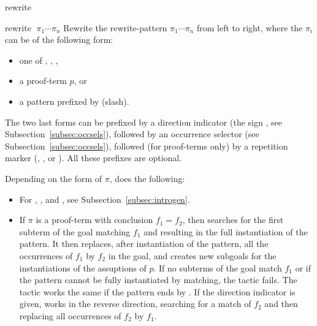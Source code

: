 \begin{tactic}{rewrite}
  \begin{tsyntax}{rewrite $\;\pi_1 \cdots \pi_n$}
  Rewrite the rewrite-pattern $\pi_1 \cdots \pi_n$ from left to right,
  where the $\pi_i$ can be of the following form:
  \begin{itemize}
  \item one of \ec{//}, \ec{/=}, \ec{//=},
  \item a proof-term $p$, or
  \item a pattern prefixed by \ec{/} (slash).
  \end{itemize}
  The two last forms can be prefixed by a direction indicator (the
  sign \ec{-}, see Subsection~\ref{subsec:occsels}), followed by an
  occurrence selector (see Subsection~\ref{subsec:occsels}), followed
  (for proof-terms only) by a repetition marker (\ec{!}, ,
   or ). All these prefixes are optional.

  \smallskip
  Depending on the form of $\pi$,  does the following:
    \begin{itemize}
    \item For \ec{//}, \ec{/=}, and \ec{//=}, see
      Subsection~\ref{subsec:introgen}.

    \item If $\pi$ is a proof-term with conclusion $f_1=f_2$, then
       searches for the first subterm of the goal matching
      $f_1$ and resulting in the full instantiation of the pattern.
      It then replaces, after instantiation of the pattern, all the
      occurrences of $f_1$ by $f_2$ in the goal, and creates
      new subgoals for the instantiations of the assuptions of $p$.
      If no subterms of the goal match $f_1$ or if the pattern
      cannot be fully instantiated by matching, the tactic fails.  The
      tactic works the same if the pattern ends by . If
      the direction indicator \ec{-} is given,  works in
      the reverse direction, searching for a match of $f_2$ and then
      replacing all occurrences of $f_2$ by $f_1$.


\end{itemize}
\end{tsyntax}
\end{tactic}
